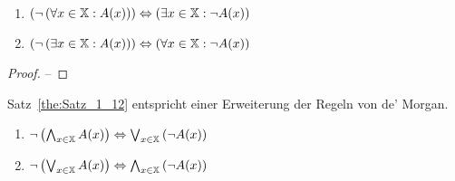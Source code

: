 \begin{theorem}~
\begin{enumerate}
\item $\left(\neg \left(\forall x \in \mathbb{X} : A(x)\right)\right) \Leftrightarrow \left(\exists x \in \mathbb{X} : \neg A(x)\right)$
\item $\left(\neg \left(\exists x \in \mathbb{X} : A(x)\right)\right) \Leftrightarrow \left(\forall x \in \mathbb{X} : \neg A(x)\right)$
\end{enumerate}
\label{the:Satz_1_12}
\end{theorem}

\begin{proof}
--
\end{proof}

\begin{note}
Satz~\vref{the:Satz_1_12} entspricht einer Erweiterung der Regeln von de' Morgan.
\begin{enumerate}
\item $\neg \left(\bigwedge_{x \in \mathbb{X}} A(x)\right) \Leftrightarrow \bigvee_{x \in \mathbb{X}} \left(\neg A(x)\right)$
\item $\neg \left(\bigvee_{x \in \mathbb{X}} A(x)\right) \Leftrightarrow \bigwedge_{x \in \mathbb{X}} \left(\neg A(x)\right)$
\end{enumerate}
\end{note}
